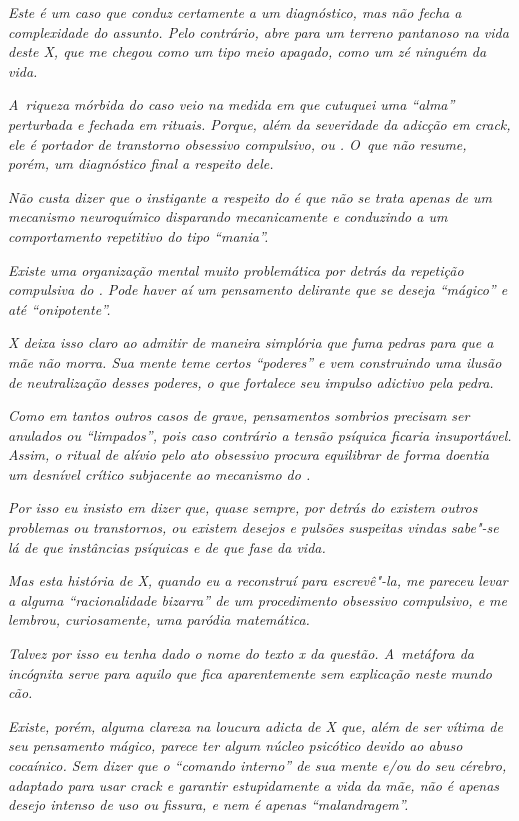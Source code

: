\emph{Este é um caso que conduz certamente a um diagnóstico, mas não
fecha a complexidade do assunto. Pelo contrário, abre para um terreno
pantanoso na vida deste X, que me chegou como um tipo meio apagado, como
um zé ninguém da vida.}~

\emph{A~riqueza mórbida do caso veio na medida em que cutuquei uma
``alma'' perturbada e fechada em rituais. Porque, além da severidade da
adicção em crack, ele é portador de transtorno obsessivo compulsivo, ou
. O~que não resume, porém, um diagnóstico final a respeito dele.}~

\emph{Não custa dizer que o instigante a respeito do  é que não se
trata apenas de um mecanismo neuroquímico disparando mecanicamente e
conduzindo a um comportamento repetitivo do tipo ``mania''.}~

\emph{Existe uma organização mental muito problemática por detrás da
repetição compulsiva do . Pode haver aí um pensamento delirante que
se deseja ``mágico'' e até ``onipotente''.}

\emph{X deixa isso claro ao admitir de maneira simplória que fuma pedras
para que a mãe não morra. Sua mente teme certos ``poderes'' e vem
construindo uma ilusão de neutralização desses poderes, o que fortalece
seu impulso adictivo pela pedra.}~

\emph{Como em tantos outros casos de  grave, pensamentos sombrios
precisam ser anulados ou ``limpados'', pois caso contrário a tensão
psíquica ficaria insuportável. Assim, o ritual de alívio pelo ato
obsessivo procura equilibrar de forma doentia um desnível crítico
subjacente ao mecanismo do .}~

\emph{Por isso eu insisto em dizer que, quase sempre, por detrás do 
existem outros problemas ou transtornos, ou existem desejos e pulsões
suspeitas vindas sabe"-se lá de que instâncias psíquicas e de que fase da
vida.}~

\emph{Mas esta história de X, quando eu a reconstruí para escrevê"-la, me
pareceu levar a alguma ``racionalidade bizarra'' de um procedimento
obsessivo compulsivo, e me lembrou, curiosamente, uma paródia
matemática.}~

\emph{Talvez por isso eu tenha dado o nome do texto x da questão. A~metáfora da incógnita serve para aquilo que fica aparentemente sem
explicação neste mundo cão.}~

\emph{Existe, porém, alguma clareza na loucura adicta de X que, além de
ser vítima de seu pensamento mágico, parece ter algum núcleo psicótico
devido ao abuso cocaínico. Sem dizer que o ``comando interno'' de sua
mente e/ou do seu cérebro, adaptado para usar crack e garantir
estupidamente a vida da mãe, não é apenas desejo intenso de uso ou
fissura, e nem é apenas ``malandragem''.}~

